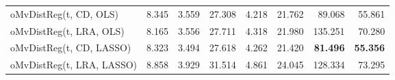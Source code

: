 \begin{tabular}{lrrrrrrr}
oMvDistReg(t, CD, OLS) & {\cellcolor[HTML]{F9BC39}} \color[HTML]{000000} 8.345 & {\cellcolor[HTML]{3FF68A}} \color[HTML]{000000} 3.559 & {\cellcolor[HTML]{434EBA}} \color[HTML]{F1F1F1} 27.308 & {\cellcolor[HTML]{4040A2}} \color[HTML]{F1F1F1} 4.218 & {\cellcolor[HTML]{46F884}} \color[HTML]{000000} 21.762 & {\cellcolor[HTML]{4771E9}} \color[HTML]{F1F1F1} 89.068 & {\cellcolor[HTML]{351E58}} \color[HTML]{F1F1F1} 55.861 \\
oMvDistReg(t, LRA, OLS) & {\cellcolor[HTML]{BEF434}} \color[HTML]{000000} 8.165 & {\cellcolor[HTML]{38F491}} \color[HTML]{000000} 3.556 & {\cellcolor[HTML]{4687FB}} \color[HTML]{F1F1F1} 27.711 & {\cellcolor[HTML]{4391FE}} \color[HTML]{F1F1F1} 4.318 & {\cellcolor[HTML]{7DFF56}} \color[HTML]{000000} 21.980 & {\cellcolor[HTML]{A11201}} \color[HTML]{F1F1F1} 135.251 & {\cellcolor[HTML]{D2E935}} \color[HTML]{000000} 70.280 \\
oMvDistReg(t, CD, LASSO) & {\cellcolor[HTML]{F5C53A}} \color[HTML]{000000} 8.323 & {\cellcolor[HTML]{1CCDD8}} \color[HTML]{000000} 3.494 & {\cellcolor[HTML]{477BF2}} \color[HTML]{F1F1F1} 27.618 & {\cellcolor[HTML]{4664DA}} \color[HTML]{F1F1F1} 4.262 & {\cellcolor[HTML]{18DBC5}} \color[HTML]{000000} 21.420 & {\cellcolor[HTML]{30123B}} \color[HTML]{F1F1F1} \bfseries 81.496 & {\cellcolor[HTML]{30123B}} \color[HTML]{F1F1F1} \bfseries 55.356 \\
oMvDistReg(t, LRA, LASSO) & {\cellcolor[HTML]{7A0403}} \color[HTML]{F1F1F1} 8.858 & {\cellcolor[HTML]{7A0403}} \color[HTML]{F1F1F1} 3.929 & {\cellcolor[HTML]{7A0403}} \color[HTML]{F1F1F1} 31.514 & {\cellcolor[HTML]{DD3D08}} \color[HTML]{F1F1F1} 4.861 & {\cellcolor[HTML]{7A0403}} \color[HTML]{F1F1F1} 24.045 & {\cellcolor[HTML]{E5470B}} \color[HTML]{F1F1F1} 128.334 & {\cellcolor[HTML]{FDAE35}} \color[HTML]{000000} 73.295 \\
\bottomrule
\end{tabular}
